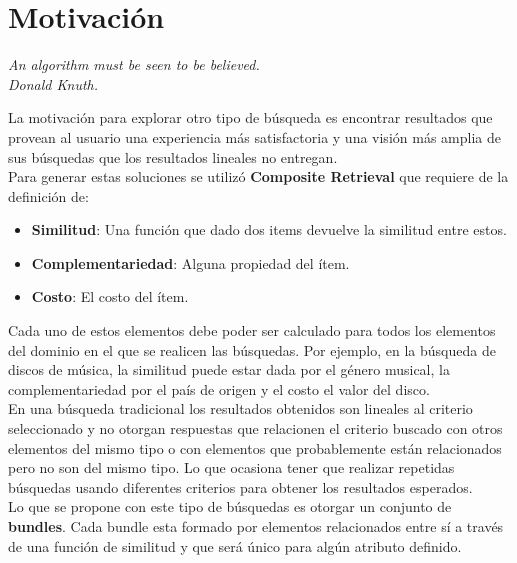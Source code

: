\section{Motivación}
{\begin{small}%
\begin{flushright}%
\it An algorithm must be seen to be believed.\\Donald Knuth.
\end{flushright}%
\end{small}%
\vspace{.5cm}}
La motivación para explorar otro tipo de búsqueda es encontrar resultados que provean al 
usuario una experiencia más satisfactoria y una visión más amplia de sus búsquedas que los 
resultados lineales no entregan.\\
Para generar estas soluciones se utilizó \textbf{Composite Retrieval} que requiere de la definición de: 
\begin{itemize}
  \item \textbf{Similitud}: Una función que dado dos items devuelve la similitud entre estos.
  \item \textbf{Complementariedad}: Alguna propiedad del ítem.
  \item \textbf{Costo}: El costo del ítem. 
\end{itemize}
Cada uno de estos elementos debe poder ser calculado para todos los elementos del dominio en el que 
se realicen las búsquedas. Por ejemplo, en la búsqueda de discos de música, la similitud puede estar 
dada por el género musical, la complementariedad por el país de origen y el costo el valor del 
disco.\\
En una búsqueda tradicional los resultados obtenidos son lineales al criterio seleccionado y no 
otorgan respuestas que relacionen el criterio buscado con otros elementos del mismo tipo o 
con elementos que probablemente están relacionados pero no son del mismo tipo. Lo que ocasiona 
tener que realizar repetidas búsquedas usando diferentes criterios para obtener los resultados 
esperados.\\
Lo que se propone con este tipo de búsquedas es otorgar un conjunto de \textbf{bundles}. Cada 
bundle esta formado por elementos relacionados entre sí a través de una función de similitud y que 
será único para algún atributo definido.
